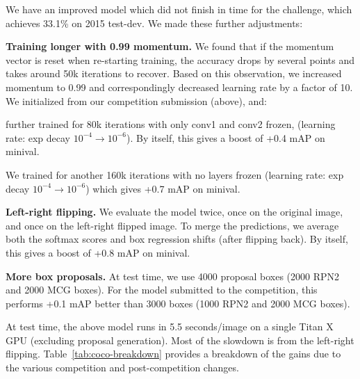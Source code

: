 \documentclass[10pt,twocolumn,letterpaper]{article}
\begin{document}
We have an improved model which did not finish in time for the challenge, which
achieves 33.1\% on 2015 test-dev.  We made these further adjustments:
\begin{packed_enum}
%
  \item \textbf{Training longer with 0.99 momentum.}  We found that if the
    momentum vector is reset when re-starting training, the accuracy drops by
    several points and takes around 50k iterations to recover.  Based on this
    observation, we increased momentum to 0.99 and correspondingly decreased
    learning rate by a factor of 10.  We initialized from our competition
    submission (above), and:
    \begin{packed_enum}
      \item further trained for
      80k iterations with only conv1 and conv2 frozen, (learning rate: exp decay
      $10^{-4} \rightarrow 10^{-6}$).
      By itself, this gives a boost of +0.4 mAP on minival.
    \item We trained for another 160k iterations with no layers frozen (learning
      rate: exp decay $10^{-4} \rightarrow 10^{-6}$) which gives +0.7 mAP on
      minival.
  \end{packed_enum}
%
  \item \textbf{Left-right flipping.}  We evaluate the model twice, once on the
    original image, and once on the left-right flipped image.  To merge the
    predictions, we average both the softmax scores and box regression shifts
    (after flipping back).  By itself, this gives a boost of +0.8 mAP on minival.
%
  \item \textbf{More box proposals.} At test time, we use 4000 proposal boxes
    (2000 RPN2 and 2000 MCG boxes).  For the model submitted to the competition,
    this performs +0.1 mAP better than 3000 boxes (1000 RPN2 and 2000 MCG
    boxes).
%
\end{packed_enum}
At test time, the above model runs in 5.5 seconds/image on a single Titan X GPU
(excluding proposal generation).  Most of the slowdown is from the left-right
flipping. Table~\ref{tab:coco-breakdown} provides a breakdown of the gains due
to the various competition and post-competition changes.


%
\end{document}
